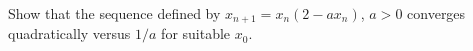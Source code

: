 Show that the sequence defined by $x_{n+1} = x_n(2 - ax_n)$, $a > 0$ converges quadratically versus $1/a$ for suitable $x_0$.
